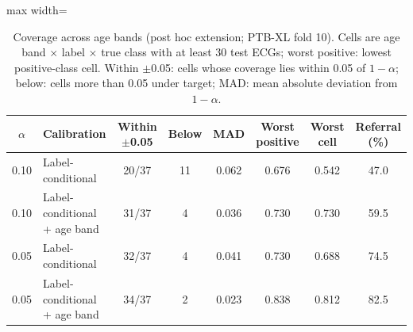 \begin{table}[!t]
\centering\small
\caption{Coverage across age bands (post hoc extension; PTB-XL fold 10). Cells are age band $\times$ label $\times$ true class with at least 30 test ECGs; worst positive: lowest positive-class cell. Within $\pm$0.05: cells whose coverage lies within 0.05 of $1-\alpha$; below: cells more than 0.05 under target; MAD: mean absolute deviation from $1-\alpha$.}
\label{tab:age}
\setlength{\tabcolsep}{3pt}
\begin{adjustbox}{max width=\linewidth}
\begin{tabular}{clcccccc}
\toprule
$\alpha$ & Calibration & Within $\pm$0.05 & Below & MAD & Worst positive & Worst cell & Referral (\%) \\
\midrule
0.10 & Label-conditional & 20/37 & 11 & 0.062 & 0.676 & 0.542 & 47.0 \\
0.10 & Label-conditional + age band & 31/37 & 4 & 0.036 & 0.730 & 0.730 & 59.5 \\
0.05 & Label-conditional & 32/37 & 4 & 0.041 & 0.730 & 0.688 & 74.5 \\
0.05 & Label-conditional + age band & 34/37 & 2 & 0.023 & 0.838 & 0.812 & 82.5 \\
\bottomrule
\end{tabular}
\end{adjustbox}
\end{table}
